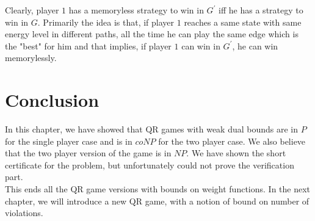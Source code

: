 Clearly, player $1$ has a memoryless strategy to win in $G^{\prime}$ iff he has a strategy to win in $G$. Primarily the idea is that, if player $1$ reaches a same state with same energy level in different paths, all the time he can play the same edge which is the "best" for him and that implies, if player $1$ can win in $G^{\prime}$, he can win memorylessly.
\vskip 0.5cm
\section{Conclusion}
In this chapter, we have showed that QR games with weak dual bounds are in $P$ for the single player case and is in $coNP$ for the two player case. We also believe that the two player version of the game is in $NP$. We have shown the short certificate for the problem, but unfortunately could not prove the verification part.\\
This ends all the QR game versions with bounds on weight functions. In the next chapter, we will introduce a new QR game, with a notion of bound on number of violations.